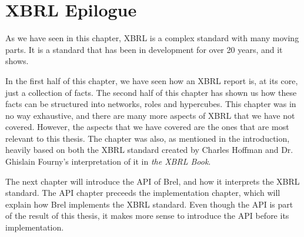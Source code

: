 \section{XBRL Epilogue}

As we have seen in this chapter, XBRL is a complex standard with many moving parts.
It is a standard that has been in development for over 20 years, and it shows.

In the first half of this chapter, we have seen how an XBRL report is, at its core, just a collection of facts.
The second half of this chapter has shown us how these facts can be structured into networks, roles and hypercubes.
This chapter was in no way exhaustive, and there are many more aspects of XBRL that we have not covered.
However, the aspects that we have covered are the ones that are most relevant to this thesis.
The chapter was also, as mentioned in the introduction, 
heavily based on both the XBRL standard\cite{xbrl} created by Charles Hoffman and 
Dr. Ghislain Fourny's interpretation of it in \textit{the XBRL Book}\cite{fourny2023xbrl}.

The next chapter will introduce the API of Brel, and how it interprets the XBRL standard.
The API chapter preceeds the implementation chapter, which will explain how Brel implements the XBRL standard.
Even though the API is part of the result of this thesis, it makes more sense to introduce the API before its implementation.
